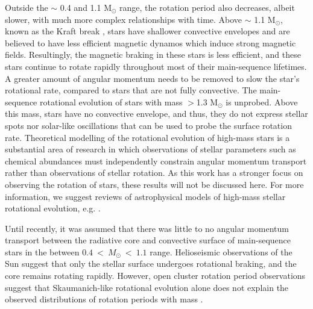 Outside the $\sim$ 0.4 and 1.1 M$_{\odot}$ range, the rotation period also decreases, albeit slower, with much more complex relationships with time.
Above $\sim$ 1.1 M$_{\odot}$, known as the Kraft break \citep{kraft_studies_1967}, stars have shallower convective envelopes and are believed to have less efficient magnetic dynamos which induce strong magnetic fields.
Resultingly, the magnetic braking in these stars is less efficient, and these stars continue to rotate rapidly throughout most of their main-sequence lifetimes. 
A greater amount of angular momentum needs to be removed to slow the star's rotational rate, compared to stars that are not fully convective.
The main-sequence rotational evolution of stars with mass $>$1.3 M$_{\odot}$ is unprobed.
Above this mass, stars have no convective envelope, and thus, they do not express stellar spots nor solar-like oscillations that can be used to probe the surface rotation rate.
Theoretical modelling of the rotational evolution of high-mass stars is a substantial area of research in which observations of stellar parameters such as chemical abundances must independently constrain angular momentum transport rather than observations of stellar rotation.
As this work has a stronger focus on observing the rotation of stars, these results will not be discussed here.
For more information, we suggest reviews of astrophysical models of high-mass stellar rotational evolution, e.g. \citet{heger_presupernova_1998,maeder_evolution_2000,maeder_physics_2009}.

Until recently, it was assumed that there was little to no angular momentum transport between the radiative core and convective surface of main-sequence stars in the between $0.4 \ < \ M_{\odot} \  < \ 1.1$ range. 
Helioseismic observations of the Sun suggest that only the stellar surface undergoes rotational braking, and the core remains rotating rapidly.
However, open cluster rotation period observations suggest that Skaumanich-like rotational evolution alone does not explain the observed distributions of rotation periods with mass \citep{spada_competing_2020}.

